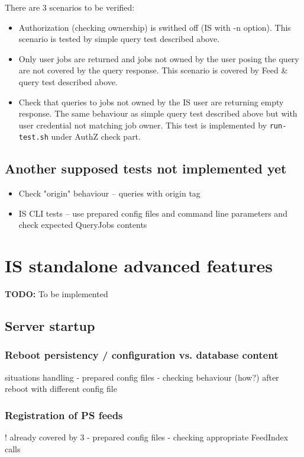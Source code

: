 \documentclass{egee}
\def\todo#1{\textbf{TODO:} #1}
\begin{document}
\begin{enumerate}
There are 3 scenarios to be verified:
\begin{itemize}
 \item Authorization (checking ownership) is swithed off (IS with -n
   option). This scenario is tested by simple query test described above.
 \item Only user jobs are returned and jobs not owned by the user posing
   the query are not covered by the query response. This scenario is
   covered by Feed \& query test described above.
 \item Check that queries to jobs not owned by the IS user are
   returning empty response. The same behaviour as simple query test
   described above but with user credential not matching job
   owner. This test is implemented by \texttt{run-test.sh} under AuthZ
   check part.
\end{itemize}

\subsection{Another supposed tests not implemented yet}

\begin{itemize}
 \item Check "origin" behaviour -- queries with origin tag
 \item IS CLI tests -- use prepared config files and command line parameters
  and check expected QueryJobs contents
\end{itemize}


\section{IS standalone advanced features}
\todo{To be implemented}

\subsection{Server startup}

\subsubsection{Reboot persistency / configuration vs. database content}
    situations handling
- prepared config files
- checking behaviour (how?) after reboot with different config file

\subsubsection{Registration of PS feeds}
! already covered by 3
- prepared config files
- checking appropriate FeedIndex calls


\end{enumerate}
\end{document}
